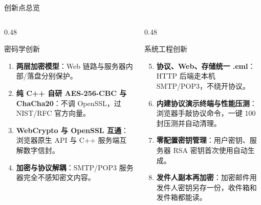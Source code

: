 \documentclass[aspectratio=169,10pt]{beamer}
\newcommand{\key}[1]{\textcolor{MFAccent}{\textbf{#1}}}
\begin{document}
\begin{frame}{创新点总览}
  \begin{columns}[T]
    \begin{column}{0.48\textwidth}
      \begin{block}{密码学创新}
        \begin{enumerate}
          \item \key{两层加密模型}：Web 链路与服务器内部/落盘分别保护。
          \item \key{纯 C++ 自研 AES-256-CBC 与 ChaCha20}：不调 OpenSSL，过 NIST/RFC 官方向量。
          \item \key{WebCrypto 与 OpenSSL 互通}：浏览器原生 API 与 C++ 服务端互解数字信封。
          \item \key{加密与协议解耦}：SMTP/POP3 服务器完全不感知密文内容。
        \end{enumerate}
      \end{block}
    \end{column}
    \begin{column}{0.48\textwidth}
      \begin{block}{系统工程创新}
        \begin{enumerate}
          \setcounter{enumi}{4}
          \item \key{协议、Web、存储统一 .eml}：HTTP 后端走本机 SMTP/POP3，不绕开协议。
          \item \key{内建协议演示终端与性能压测}：浏览器手敲协议命令，一键 100 封压测并自动清理。
          \item \key{零配置密钥管理}：用户密钥、服务器 RSA 密钥首次使用自动生成。
          \item \key{发件人副本再加密}：加密邮件用发件人密钥另存一份，收件箱和发件箱都能读。
        \end{enumerate}
      \end{block}
    \end{column}
  \end{columns}
\end{frame}
\end{document}
